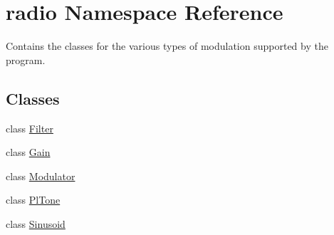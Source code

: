 \hypertarget{namespaceradio}{\section{radio Namespace Reference}
\label{namespaceradio}
}


Contains the classes for the various types of modulation supported by the program.  


\subsection*{Classes}
\begin{DoxyCompactItemize}
\item 
class \hyperlink{classradio_1_1Filter}{Filter}
\item 
class \hyperlink{classradio_1_1Gain}{Gain}
\item 
class \hyperlink{classradio_1_1Modulator}{Modulator}
\item 
class \hyperlink{classradio_1_1PlTone}{Pl\+Tone}
\item 
class \hyperlink{classradio_1_1Sinusoid}{Sinusoid}
\end{DoxyCompactItemize}
